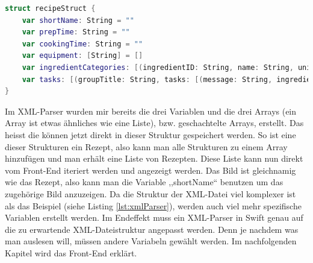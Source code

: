 \documentclass[12pt]{article}
\begin{document}
\begin{lstlisting}[language=Swift,caption={Struktur für ein Rezept},label={lst:struktur}]
struct recipeStruct {
    var shortName: String = ""
    var prepTime: String = ""
    var cookingTime: String = ""
    var equipment: [String] = []
    var ingredientCategories: [(ingredientID: String, name: String, unit: String)] = [] //X: ingredientX[0: ID, 1: Name, 2: Unit]
    var tasks: [(groupTitle: String, tasks: [(message: String, ingredientID: String, minMax: [String])])] = [] //X: groupX[0: groupTitle, X: taskX[0: message, 1: ingredientID, 2: minMax[min,max]]]
}
\end{lstlisting}
Im XML-Parser wurden mir bereits die drei Variablen und die drei Arrays (ein Array ist etwas ähnliches wie eine Liste), bzw. geschachtelte Arrays, erstellt. Das heisst die können jetzt direkt in dieser Struktur gespeichert werden. So ist eine dieser Strukturen ein Rezept, also kann man alle Strukturen zu einem Array hinzufügen und man erhält eine Liste von Rezepten. Diese Liste kann nun direkt vom Front-End iteriert werden und angezeigt werden. Das Bild ist gleichnamig wie das Rezept, also kann man die Variable ,,shortName`` benutzen um das zugehörige Bild anzuzeigen. Da die Struktur der XML-Datei viel komplexer ist als das Beispiel (siehe Listing \ref{lst:xmlParser}), werden auch viel mehr spezifische Variablen erstellt werden. Im Endeffekt muss ein XML-Parser in Swift genau auf die zu erwartende XML-Dateistruktur angepasst werden. Denn je nachdem was man auslesen will, müssen andere Variabeln gewählt werden. Im nachfolgenden Kapitel wird das Front-End erklärt. \cite{xmlParserIosCreator}
\end{document}
